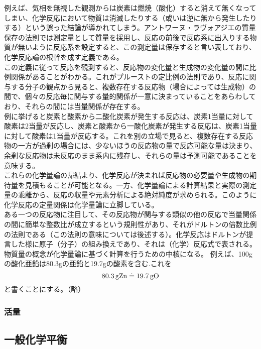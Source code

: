 \documentclass[dvipdfmx,uplatex]{jsarticle}
\begin{document}
例えば、気相を無視した観測からは炭素は燃焼（酸化）すると消えて無くなってしまい、化学反応において物質は消滅したりする（或いは逆に無から発生したりする）という誤った結論が導かれてしまう。アントワーヌ・ラヴォアジエの質量保存の法則では測定量として質量を採用し、反応の前後で反応系に出入りする物質が無いように反応系を設定すると、この測定量は保存すると言い表しており、化学反応論の根幹を成す定義である。 \\

この定義に従って反応を観測すると、反応物の変化量と生成物の変化量の間に比例関係があることがわかる。これがプルーストの定比例の法則であり、反応に関与する分子の観点から見ると、複数存在する反応物（場合によっては生成物）の間で、個々の反応毎に関与する量的関係が一意に決まっていることをあらわしており、それらの間には当量関係が存在する。 \\

例に挙げると炭素と酸素から二酸化炭素が発生する反応は、炭素1当量に対して酸素は2当量が反応し、炭素と酸素から一酸化炭素が発生する反応は、炭素1当量に対して酸素は1当量が反応する。これを別の立場で見ると、複数存在する反応物の一方が過剰の場合には、少ないほうの反応物の量で反応可能な量は決まり、余剰な反応物は未反応のまま系内に残存し、それらの量は予測可能であることを意味する。 \\

これらの化学量論の帰結より、化学反応が決まれば反応物の必要量や生成物の期待量を見積もることが可能となる。一方、化学量論による計算結果と実際の測定量の乖離から、反応の収量や元素分析による絶対純度が求められる。このように化学反応の定量関係は化学量論に立脚している。 \\

ある一つの反応物に注目して、その反応物が関与する類似の他の反応で当量関係の間に簡単な整数比が成立するという規則性があり、それがドルトンの倍数比例の法則である（この法則の意味については後述する）。化学反応はドルトンが提言した様に原子（分子）の組み換えであり、それは（化学）反応式で表される。 \\
物質量の概念が化学量論に基づく計算を行うための中核になる。
例えば、100gの酸化亜鉛は80.3gの亜鉛と19.7gの酸素を含む.これを
\[
\ce{80.3gZn} \doteq \ce{19.7gO}
\]
と書くことにする。（略）

\subsubsection{活量}

\subsection{一般化学平衡}
\end{document}
